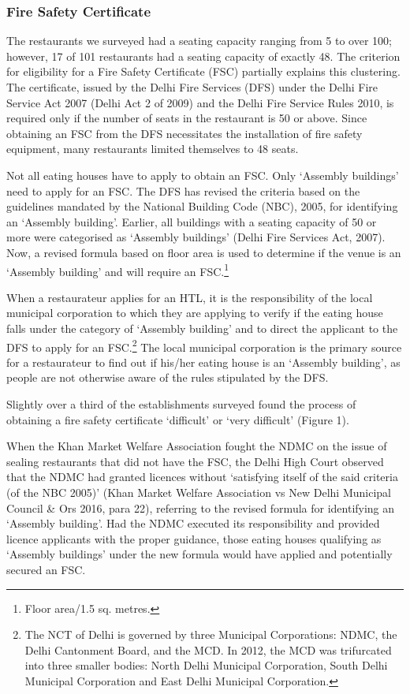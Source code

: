 \documentclass[a4paper, 12pt]{article}
\begin{document}
     
		\subsubsection{Fire Safety Certificate}
		The restaurants we surveyed had a seating capacity ranging from 5 to over 100; however, 17 of 101 restaurants had a seating capacity of exactly 48. The criterion for eligibility for a Fire Safety Certificate (FSC) partially explains this clustering. The certificate, issued by the Delhi Fire Services (DFS) under the Delhi Fire Service Act 2007 (Delhi Act 2 of 2009) and the Delhi Fire Service Rules 2010, is required only if the number of seats in the restaurant is 50 or above. Since obtaining an FSC from the DFS necessitates the installation of fire safety equipment, many restaurants limited themselves to 48 seats. %
		
		Not all eating houses have to apply to obtain an FSC. Only ‘Assembly buildings’ need to apply for an FSC. The DFS has revised the criteria based on the guidelines mandated by the National Building Code (NBC), 2005, for identifying an ‘Assembly building’. Earlier, all buildings with a seating capacity of 50 or more were categorised as ‘Assembly buildings’ (Delhi Fire Services Act, 2007). Now, a revised formula based on floor area is used to determine if the venue is an ‘Assembly building’ and will require an FSC.\footnote{Floor area/1.5 sq. metres.} 
		
		When a restaurateur applies for an HTL, it is the responsibility of the local municipal corporation to which they are applying to verify if the eating house falls under the category of ‘Assembly building’ and to direct the applicant to the DFS to apply for an FSC.\footnote{The NCT of Delhi is governed by three Municipal Corporations: NDMC, the Delhi Cantonment Board, and the MCD. In 2012, the MCD was trifurcated into three smaller bodies: North Delhi Municipal Corporation, South Delhi Municipal Corporation and East Delhi Municipal Corporation.} The local municipal corporation is the primary source for a restaurateur to find out if his/her eating house is an ‘Assembly building’, as people are not otherwise aware of the rules stipulated by the DFS. %
		
		Slightly over a third of the establishments surveyed found the process of obtaining a fire safety certificate ‘difficult’ or ‘very difficult’ (Figure 1). 
		
		When the Khan Market Welfare Association fought the NDMC on the issue of sealing restaurants that did not have the FSC, the Delhi High Court observed that the NDMC had granted licences without ‘satisfying itself of the said criteria (of the NBC 2005)’ (Khan Market Welfare Association vs New Delhi Municipal Council \& Ors 2016, para 22), referring to the revised formula for identifying an ‘Assembly building’. Had the NDMC executed its responsibility and provided licence applicants with the proper guidance, those eating houses qualifying as ‘Assembly buildings’ under the new formula would have applied and potentially secured an FSC.%
		
\end{document}
